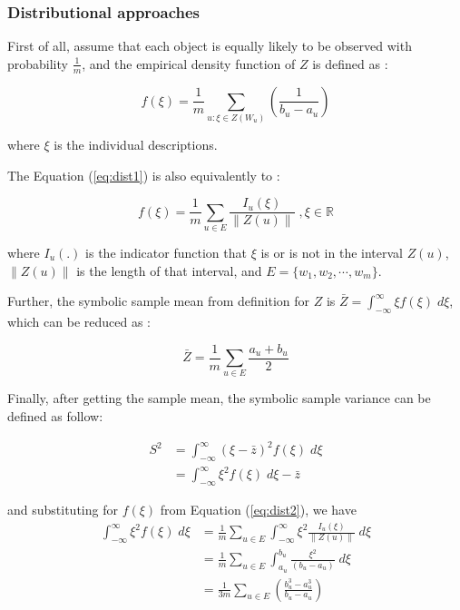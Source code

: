 \documentclass[article]{jss}
\begin{document}
\subsubsection{Distributional approaches}
First of all, assume that each object is equally likely to be observed with probability $\frac{1}{m}$, and the empirical density function of $Z$ is defined as : 

\begin{equation}\label{eq:dist1}
f(\xi) = \frac{1}{m} \sum_{u:\xi \in Z(W_u)}(\frac{1}{b_u-a_u})
\end{equation}

where $\xi$ is the individual descriptions.


The Equation (\ref{eq:dist1}) is also equivalently to :

\begin{equation}\label{eq:dist2}
f(\xi) = \frac{1}{m}\sum_{u \in E}\frac{I_u(\xi)}{\| Z(u) \|}\;,\xi \in \mathbb{R}
\end{equation}

where $I_u(.)$ is the indicator function that $\xi$ is or is not in the interval $Z(u)$, $\| Z(u) \|$ is the length of that interval, and $E=\{w_1,w_2,\cdots,w_m \}$.

Further, the symbolic sample mean from definition for $Z$ is $\bar{Z} = \int_{-\infty}^{\infty} \xi f(\xi)\;d\xi$, which can be reduced as :

\begin{equation}\label{eq:mean}
\bar{Z}=\frac{1}{m}\sum_{u \in E}\frac{a_u+b_u}{2}
\end{equation}

Finally, after getting the sample mean, the symbolic sample variance can be defined as follow:

\begin{equation}\label{eq:varDef}
\begin{split}
S^2 & = \int_{-\infty}^{\infty} (\xi - \bar{z})^2f(\xi)\;d\xi \\
 & = \int_{-\infty}^{\infty} \xi^2f(\xi)\;d\xi-\bar{z}
\end{split}
\end{equation}

and substituting for $f(\xi)$ from Equation (\ref{eq:dist2}), we have 
\begin{equation}\label{eq:derived}
\begin{split}
\int_{-\infty}^{\infty} \xi^2f(\xi)\;d\xi &= \frac{1}{m}\sum_{u \in E}\int_{-\infty}^{\infty} \xi^2 \frac{I_u(\xi)}{\| Z(u) \|}\;d\xi \\
&= \frac{1}{m}\sum_{u \in E} \int_{a_u}^{b_u} \frac{\xi^2}{(b_u-a_u)}\;d\xi \\
&= \frac{1}{3m} \sum_{u \in E}(\frac{b_u^3 - a_u^3}{b_u-a_u})
\end{split}
\end{equation}
\end{document}
